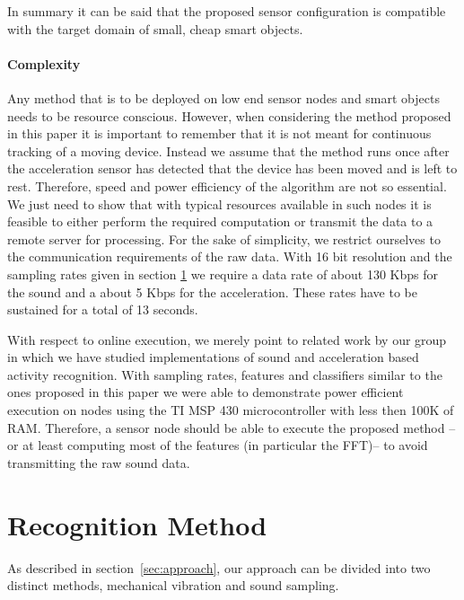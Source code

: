 In summary it can be said that the proposed sensor configuration is 
compatible with the target domain of small, cheap smart objects. 

\paragraph{Complexity}
Any method that is to be deployed on low end sensor nodes and smart
objects needs to be resource conscious.
However, when considering the method proposed in this paper it is important to
remember that it is not meant for continuous tracking of a
moving device. Instead we assume that the method runs once
after the acceleration sensor has detected that the device has been
moved and is left to rest. Therefore, speed and power efficiency of the algorithm
are not so essential. We just need to
show that with typical resources available in such nodes
it is feasible to either perform the required computation or transmit
the data to a remote server for processing.
For the sake of simplicity, we restrict ourselves to the
communication requirements of the raw data.
With 16 bit resolution and the sampling rates
given in section \ref{sec:recognition} we require a data rate of about
130 Kbps for the sound and a about 5 Kbps for the acceleration. These rates
have to be sustained for a total of 13 seconds.

With respect to online execution, we merely point to related work by
our group in which we have studied implementations of sound and
acceleration based activity recognition\cite{1033880}. With sampling rates, features
and classifiers similar to the ones proposed in this paper we were able
to demonstrate power efficient execution on nodes using the TI MSP 430
microcontroller with less then 100K of RAM. 
Therefore, a sensor node should be able to execute the proposed method
--or at least computing most of the features (in particular the FFT)--
to avoid transmitting the raw sound data.

\section{Recognition Method}
\label{sec:recognition}
As described in section~\ref{sec:approach}, our approach can be divided into two distinct methods, mechanical vibration and sound sampling. 

